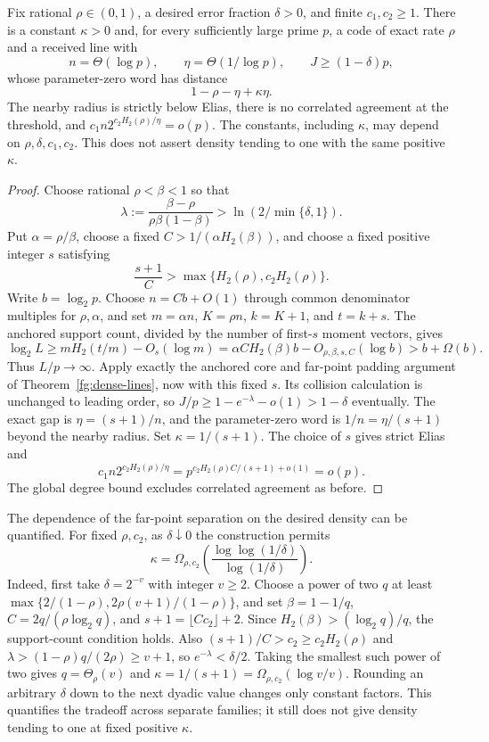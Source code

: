 \begin{theorem}
\label{fg:gap-scale-far}
Fix rational $\rho\in(0,1)$, a desired error fraction $\delta>0$,
and finite $c_1,c_2\ge1$. There is a constant $\kappa>0$ and, for
every sufficiently large prime $p$, a code of exact rate $\rho$ and
a received line with
\[
 n=\Theta(\log p),\qquad \eta=\Theta(1/\log p),\qquad
 J\ge(1-\delta)p,
\]
whose parameter-zero word has distance
\[
 1-\rho-\eta+\kappa\eta.
\]
The nearby radius is strictly below Elias, there is no correlated
agreement at the threshold, and
$c_1n2^{c_2H_2(\rho)/\eta}=o(p)$.
The constants, including $\kappa$, may depend on
$\rho,\delta,c_1,c_2$. This does not assert density tending to one
with the same positive $\kappa$.
\end{theorem}
\begin{proof}
Choose rational $\rho<\beta<1$ so that
\[
 \lambda:=\frac{\beta-\rho}{\rho\beta(1-\beta)}
 >\ln(2/\min\{\delta,1\}).
\]
Put $\alpha=\rho/\beta$, choose a fixed
$C>1/(\alpha H_2(\beta))$, and choose a fixed positive integer $s$
satisfying
\[
 \frac{s+1}{C}>\max\{H_2(\rho),c_2H_2(\rho)\}.
\]
Write $b=\log_2p$. Choose $n=Cb+O(1)$ through common denominator
multiples for $\rho,\alpha$, and set
$m=\alpha n$, $K=\rho n$, $k=K+1$, and $t=k+s$.
The anchored support count, divided by the number of first-$s$ moment
vectors, gives
\[
 \log_2L\ge mH_2(t/m)-O_s(\log m)
 =\alpha C H_2(\beta)b-O_{\rho,\beta,s,C}(\log b)>b+\Omega(b).
\]
Thus $L/p\to\infty$. Apply exactly the anchored core and far-point
padding argument of Theorem~\ref{fg:dense-lines}, now with this fixed
$s$. Its collision calculation is unchanged to leading order, so
$J/p\ge1-e^{-\lambda}-o(1)>1-\delta$ eventually.
The exact gap is $\eta=(s+1)/n$, and the parameter-zero word is
$1/n=\eta/(s+1)$ beyond the nearby radius. Set $\kappa=1/(s+1)$.
The choice of $s$ gives strict Elias and
\[
 c_1n2^{c_2H_2(\rho)/\eta}
 =p^{c_2H_2(\rho)C/(s+1)+o(1)}=o(p).
\]
The global degree bound excludes correlated agreement as before.
\end{proof}

The dependence of the far-point separation on the desired density
can be quantified. For fixed $\rho,c_2$, as $\delta\downarrow0$ the
construction permits
\begin{equation}\label{fg:density-separation-tradeoff}
 \kappa=\Omega_{\rho,c_2}\!\left(
 \frac{\log\log(1/\delta)}{\log(1/\delta)}\right).
\end{equation}
Indeed, first take $\delta=2^{-v}$ with integer $v\ge2$. Choose a
power of two $q$ at least
$\max\{2/(1-\rho),2\rho(v+1)/(1-\rho)\}$, and set
$\beta=1-1/q$, $C=2q/(\rho\log_2q)$, and
$s+1=\lfloor Cc_2\rfloor+2$.
Since $H_2(\beta)>(\log_2q)/q$, the support-count condition holds.
Also $(s+1)/C>c_2\ge c_2H_2(\rho)$ and
$\lambda>(1-\rho)q/(2\rho)\ge v+1$, so
$e^{-\lambda}<\delta/2$. Taking the smallest such power of two gives
$q=\Theta_\rho(v)$ and
$\kappa=1/(s+1)=\Omega_{\rho,c_2}(\log v/v)$.
Rounding an arbitrary $\delta$ down to the next dyadic value changes
only constant factors. This quantifies the tradeoff across separate
families; it still does not give density tending to one at fixed
positive $\kappa$.

